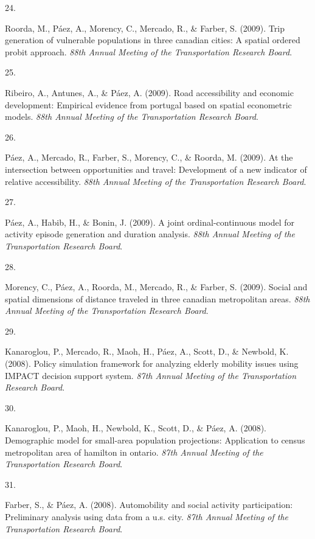 \documentclass[11pt,a4paper,]{awesome-cv}
\newlength{\cslhangindent}
\newlength{\csllabelwidth}
\newenvironment{CSLReferences}[2] %
 {\begin{list}{}{%
  \setlength{\itemindent}{0pt}
  \setlength{\leftmargin}{0pt}
  \setlength{\parsep}{0pt}
  \ifodd #1
   \setlength{\leftmargin}{\cslhangindent}
   \setlength{\itemindent}{-1\cslhangindent}
  \fi
  \setlength{\itemsep}{#2\baselineskip}}}
 {\end{list}}
\newcommand{\CSLLeftMargin}[1]{\parbox[t]{\csllabelwidth}{\strut#1\strut}}
\newcommand{\CSLRightInline}[1]{\parbox[t]{\linewidth - \csllabelwidth}{\strut#1\strut}}
\begin{document}
\begin{CSLReferences}{0}{0}
\CSLLeftMargin{24. }%
\CSLRightInline{Roorda, M., Páez, A., Morency, C., Mercado, R., \&
Farber, S. (2009). Trip generation of vulnerable populations in three
canadian cities: A spatial ordered probit approach. \emph{88th Annual
Meeting of the Transportation Research Board}.}

\CSLLeftMargin{25. }%
\CSLRightInline{Ribeiro, A., Antunes, A., \& Páez, A. (2009). Road
accessibility and economic development: Empirical evidence from portugal
based on spatial econometric models. \emph{88th Annual Meeting of the
Transportation Research Board}.}

\CSLLeftMargin{26. }%
\CSLRightInline{Páez, A., Mercado, R., Farber, S., Morency, C., \&
Roorda, M. (2009). At the intersection between opportunities and travel:
Development of a new indicator of relative accessibility. \emph{88th
Annual Meeting of the Transportation Research Board}.}

\CSLLeftMargin{27. }%
\CSLRightInline{Páez, A., Habib, H., \& Bonin, J. (2009). A joint
ordinal-continuous model for activity episode generation and duration
analysis. \emph{88th Annual Meeting of the Transportation Research
Board}.}

\CSLLeftMargin{28. }%
\CSLRightInline{Morency, C., Páez, A., Roorda, M., Mercado, R., \&
Farber, S. (2009). Social and spatial dimensions of distance traveled in
three canadian metropolitan areas. \emph{88th Annual Meeting of the
Transportation Research Board}.}

\CSLLeftMargin{29. }%
\CSLRightInline{Kanaroglou, P., Mercado, R., Maoh, H., Páez, A., Scott,
D., \& Newbold, K. (2008). Policy simulation framework for analyzing
elderly mobility issues using IMPACT decision support system. \emph{87th
Annual Meeting of the Transportation Research Board}.}

\CSLLeftMargin{30. }%
\CSLRightInline{Kanaroglou, P., Maoh, H., Newbold, K., Scott, D., \&
Páez, A. (2008). Demographic model for small-area population
projections: Application to census metropolitan area of hamilton in
ontario. \emph{87th Annual Meeting of the Transportation Research
Board}.}

\CSLLeftMargin{31. }%
\CSLRightInline{Farber, S., \& Páez, A. (2008). Automobility and social
activity participation: Preliminary analysis using data from a u.s.
city. \emph{87th Annual Meeting of the Transportation Research Board}.}


\end{CSLReferences}
\end{document}
